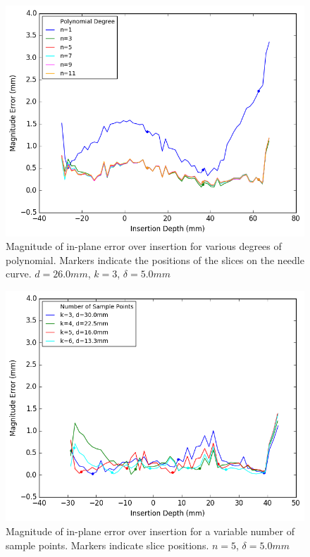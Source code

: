 \begin{figure}[h]
\includegraphics[width=1.0\textwidth]{Fig/chap5/errors_polynomials_3_samples.png}
\caption{Magnitude of in-plane error over insertion for various degrees of polynomial. Markers indicate the positions of the slices on the needle curve. $d=26.0mm$, $k=3$, $\delta=5.0mm$}
\label{fig:results_error_comparison}
\end{figure}

\begin{figure}[h]
\includegraphics[width=1.0\textwidth]{Fig/chap5/errors_more_samples.png}
\caption{Magnitude of in-plane error over insertion for a variable number of sample points. Markers indicate slice positions. $n=5$, $\delta=5.0mm$}
\label{fig:results_sample_comparison}
\end{figure}

